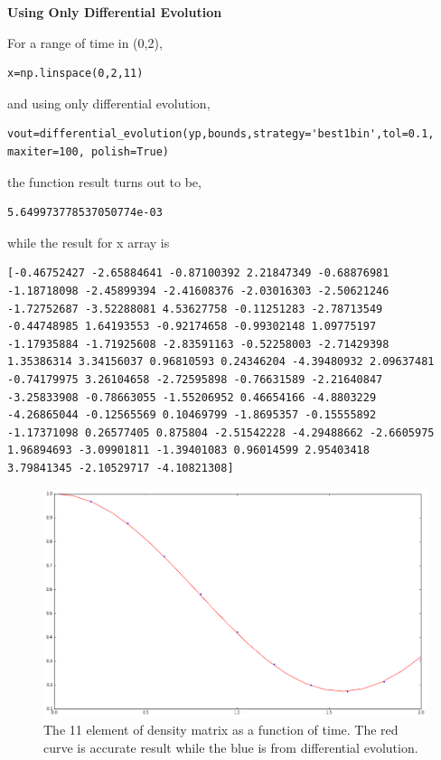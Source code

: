 \documentclass{tufte-handout}
\begin{document}
{\bf{Using Only Differential Evolution}}

For a range of time in (0,2),
\begin{verbatim}
x=np.linspace(0,2,11)
\end{verbatim}

and using only differential evolution,
\begin{verbatim}
vout=differential_evolution(yp,bounds,strategy='best1bin',tol=0.1,
maxiter=100, polish=True)
\end{verbatim}

the function result turns out to be,
\begin{verbatim}
5.649973778537050774e-03
\end{verbatim}

while the result for x array is
\begin{verbatim}
[-0.46752427 -2.65884641 -0.87100392 2.21847349 -0.68876981
-1.18718098 -2.45899394 -2.41608376 -2.03016303 -2.50621246
-1.72752687 -3.52288081 4.53627758 -0.11251283 -2.78713549
-0.44748985 1.64193553 -0.92174658 -0.99302148 1.09775197
-1.17935884 -1.71925608 -2.83591163 -0.52258003 -2.71429398
1.35386314 3.34156037 0.96810593 0.24346204 -4.39480932 2.09637481
-0.74179975 3.26104658 -2.72595898 -0.76631589 -2.21640847
-3.25833908 -0.78663055 -1.55206952 0.46654166 -4.8803229
-4.26865044 -0.12565569 0.10469799 -1.8695357 -0.15555892
-1.17371098 0.26577405 0.875804 -2.51542228 -4.29488662 -2.6605975
1.96894693 -3.09901811 -1.39401083 0.96014599 2.95403418
3.79841345 -2.10529717 -4.10821308]
\end{verbatim}



\begin{figure}
\includegraphics{assets/ann_devo}
\caption{The 11 element of density matrix as a function of time. The red curve is accurate result while the blue is from differential evolution.}
\label{fig:ann-DEvo}
\end{figure}
\end{document}
